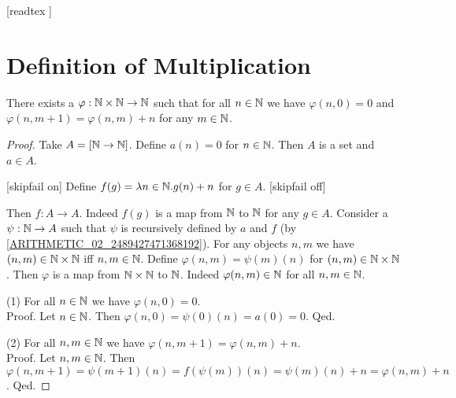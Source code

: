 \documentclass[10pt]{article}
\begin{document}
  \begin{imports}
    \begin{forthel}

      [readtex ]

    \end{forthel}
  \end{imports}


  \section{Definition of Multiplication}

  \begin{forthel}
    \begin{lemma}
      There exists a $\varphi : \mathbb{N} \times \mathbb{N} \to \mathbb{N}$ such
      that for all $n \in \mathbb{N}$ we have $\varphi(n, 0) = 0$ and
      $\varphi(n, m + 1) = \varphi(n,m) + n$ for any $m \in \mathbb{N}$.
    \end{lemma}
    \begin{proof}
      Take $A = [\mathbb{N} \to \mathbb{N}]$.
      Define $a(n) = 0$ for $n \in \mathbb{N}$.
      Then $A$ is a set and $a \in A$.

      [skipfail on] %
      Define $f(g) = \mathrm{\lambda} n \in \mathbb{N}. g(n) + n$ for $g \in A$.
      [skipfail off]

      Then $f : A \to A$.
      Indeed $f(g)$ is a map from $\mathbb{N}$ to $\mathbb{N}$ for any $g \in A$.
      Consider a $\psi : \mathbb{N} \to A$ such that $\psi$ is recursively defined by
      $a$ and $f$ (by \cref{ARITHMETIC_02_2489427471368192}).
      For any objects $n, m$ we have $(n,m) \in \mathbb{N} \times \mathbb{N}$ iff
      $n, m \in \mathbb{N}$.
      Define $\varphi(n,m) = \psi(m)(n)$ for $(n,m) \in \mathbb{N} \times \mathbb{N}$.
      Then $\varphi$ is a map from $\mathbb{N} \times \mathbb{N}$ to $\mathbb{N}$.
      Indeed $\varphi(n,m) \in \mathbb{N}$ for all $n, m \in \mathbb{N}$.

      (1) For all $n \in \mathbb{N}$ we have $\varphi(n,0) = 0$. \\
      Proof.
        Let $n \in \mathbb{N}$.
        Then $\varphi(n,0)
          = \psi(0)(n)
          = a(0)
          = 0$.
      Qed.

      (2) For all $n, m \in \mathbb{N}$ we have $\varphi(n, m + 1) =
      \varphi(n,m) + n$. \\
      Proof.
        Let $n, m \in \mathbb{N}$.
        Then $\varphi(n, m + 1)
          = \psi(m + 1)(n)
          = f(\psi(m))(n)
          = \psi(m)(n) + n
          = \varphi(n,m) + n$.
      Qed.
    \end{proof}
  \end{forthel}
\end{document}
